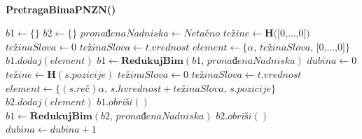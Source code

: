 \documentclass[12pt,oneside]{memoir}
\begin{document}
\\
\begin{algorithm}
  \caption{\textbf{PretragaBimaPNZN()}}
  \label{alg:bs}
  \begin{algorithmic}[1]
  \State $b1 \gets \{ \}$
  \State $b2 \gets \{ \}$
  \State $prona\textrm{đ}enaNadniska \gets Neta\textrm{č}no$
  \State
  \State $te\textrm{ž}ine \gets \textbf{H}\textrm{([0,...,0])}$
  \State
  \For{$\alpha\in\Sigma$}
    \State $te\textrm{ž}inaSlova \gets 0$
        \State $te\textrm{ž}inaSlova \gets t\textrm{.}vrednost$
      \EndIf
    \EndFor
    \State $element \gets \{\alpha\textrm{, }te\textrm{ž}inaSlova \textrm{, [0,...,0]}\}$
    \State $b1\textrm{.}dodaj(element)$
  \EndFor
  \State
  \State $b1 \gets \textbf{RedukujBim}(b1\textrm{, }prona\textrm{đ}enaNadniska)$
  \State $dubina \gets 0$
  \State
      \State $te\textrm{ž}ine \gets \textbf{H}(s.pozicije)$
      \For{$\alpha\in\Sigma$}
        \State $te\textrm{ž}inaSlova \gets 0$
            \State $te\textrm{ž}inaSlova \gets t.vrednost$
          \EndIf
        \EndFor
      \State $element \gets \{(s.re\textrm{č})\alpha\textrm{, }s.hvrednost + te\textrm{ž}inaSlova\textrm{, }s.pozicije\}$
      \State $b2\textrm{.}dodaj(element)$
      \EndFor
    \EndFor
    \State
    \State $b1\textrm{.}obri\textrm{š}i()$
    \State $b1 \gets \textbf{RedukujBim}(b2\textrm{, }prona\textrm{đ}enaNadniska)$
    \State $b2\textrm{.}obri\textrm{š}i()$
    \State $dubina \gets dubina + 1$
  \EndWhile
  \end{algorithmic}
  \end{algorithm}
\\
\\
\\
\end{document}
